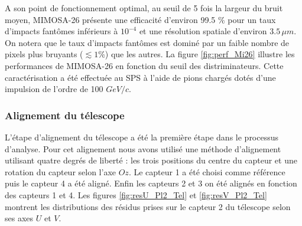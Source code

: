   \medskip
   
   A son point de fonctionnement optimal, au seuil de 5 fois la largeur du bruit moyen, MIMOSA-26 pr\'esente une efficacit\'e d'environ 99.5 $\%$ pour un taux d'impacts fant\^omes inf\'erieurs \`a $10^{-4}$ et une r\'esolution spatiale d'environ $3.5 \, \mu m$. On notera que le taux d'impacts fant\^omes est domin\'e par un faible nombre de pixels plus bruyants ($\lesssim 1\%$) que les autres. La figure \ref{fig:perf_Mi26} illustre les performances de MIMOSA-26 en fonction du seuil des distriminateurs. Cette caract\'erisation a \'et\'e effectu\'ee au SPS \`a l'aide de pions charg\'es dot\'es d'une impulsion de l'ordre de 100 $GeV/c$. 
   
   \FloatBarrier
   
   \subsubsection{Alignement du t\'elescope}
   
   L'\'etape d'alignement du t\'elescope a \'et\'e la premi\`ere \'etape dans le processus d'analyse. Pour cet alignement nous avons utilis\'e une m\'ethode d'alignement utilisant quatre degr\'es de libert\'e : les trois positions du centre du capteur et une rotation du capteur selon l'axe $Oz$. Le capteur 1 a \'et\'e choisi comme r\'ef\'erence puis le capteur 4 a \'et\'e align\'e. Enfin les capteurs 2 et 3 on \'et\'e align\'es en fonction des capteurs 1 et 4. Les figures \ref{fig:resU_Pl2_Tel} et \ref{fig:resV_Pl2_Tel} montrent les distributions des r\'esidus prises sur le capteur 2 du télescope selon ses axes $U$ et $V$.
   
   \medskip
   
